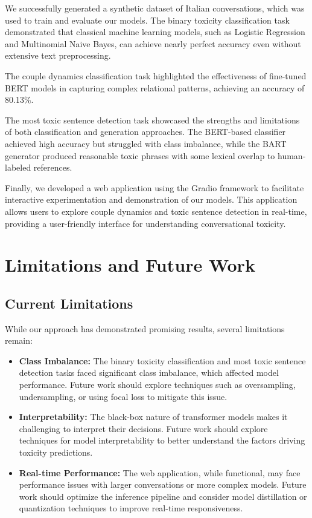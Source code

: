 \documentclass[conference]{IEEEtran}
\begin{document}
We successfully generated a synthetic dataset of Italian conversations, which was used to train and evaluate our models. The binary toxicity classification task demonstrated that classical machine learning models, such as Logistic Regression and Multinomial Naive Bayes, can achieve nearly perfect accuracy even without extensive text preprocessing.

The couple dynamics classification task highlighted the effectiveness of fine-tuned BERT models in capturing complex relational patterns, achieving an accuracy of 80.13\%.

The most toxic sentence detection task showcased the strengths and limitations of both classification and generation approaches. The BERT-based classifier achieved high accuracy but struggled with class imbalance, while the BART generator produced reasonable toxic phrases with some lexical overlap to human-labeled references.

Finally, we developed a web application using the Gradio framework to facilitate interactive experimentation and demonstration of our models. This application allows users to explore couple dynamics and toxic sentence detection in real-time, providing a user-friendly interface for understanding conversational toxicity.

\section{Limitations and Future Work}

\subsection{Current Limitations}

While our approach has demonstrated promising results, several limitations remain:

\begin{itemize}
    \item \textbf{Class Imbalance:} The binary toxicity classification and most toxic sentence detection tasks faced significant class imbalance, which affected model performance. Future work should explore techniques such as oversampling, undersampling, or using focal loss to mitigate this issue.
    \item \textbf{Interpretability:} The black-box nature of transformer models makes it challenging to interpret their decisions. Future work should explore techniques for model interpretability to better understand the factors driving toxicity predictions.
    \item \textbf{Real-time Performance:} The web application, while functional, may face performance issues with larger conversations or more complex models. Future work should optimize the inference pipeline and consider model distillation or quantization techniques to improve real-time responsiveness.
\end{itemize}
\end{document}
